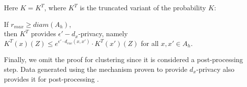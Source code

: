 Here $K = K^T$, where $K^T$ is the truncated variant of the probability $K$:
\begin{theorem}
    If $r_{max} \geq diam(A_h)$, \\
    then $K^T$ provides $\epsilon'-d_x$-privacy, namely \\
    $K^T(x)(Z) \leq e^{\epsilon' \cdot d_{euc} (x, x')} \cdot K^T(x')(Z)$  for all $x, x' \in A_h$. 
\end{theorem}

Finally, we omit the proof for clustering since it is considered a post-processing step. Data generated using the mechanism proven to provide $d_x$-privacy also provides it for post-processing \citep{feyisetan_leveraging_2019}. 
\newpage
